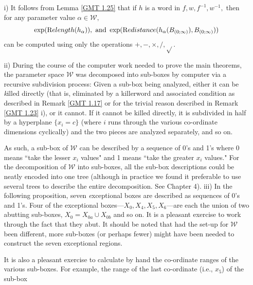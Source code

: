 \begin{remark}\label{GMT 1.26} i)  It follows from Lemma \ref{GMT 1.25} that if $h$ is a word in $f,w,f^{-1},w^{-1},$ then for any
parameter value $\alpha\in {\mathcal W},$
$$\exp({\textrm Relength}(h_\alpha)), \hbox{ and }
  \exp({\textrm Redistance}(h_\alpha(B_{(0;\infty)}), B_{(0;\infty)}))$$ can be computed using only the
operations $+, -, \times, /, \sqrt{}.$

 ii) During the course of the computer work needed to prove the main theorems, the parameter space
${\mathcal W}$ was decomposed into sub-boxes by computer via a recursive subdivision process:
Given a sub-box  being analyzed, either it can be {\textit killed directly} (that is, eliminated by a killerword and associated condition as described in
Remark \ref{GMT 1.17}
or for the trivial reason described in Remark \ref{GMT 1.23} i), or it cannot.  
If it cannot be killed directly, it is subdivided in half by a hyperplane
$\{x_i = c \}$ (where $i$ runs through the various co-ordinate dimensions
cyclically) and the two pieces are analyzed separately, and so on. 

As such, a sub-box of ${\mathcal W}$ can be described by a sequence of 0's and 1's where 0 means ``take the lesser $x_i$ values" and 1 means ``take the greater $x_i$ values."  
For the decomposition of ${\mathcal W}$ into sub-boxes, all the 
sub-box descriptions could be neatly encoded into one tree (although in practice we found it preferable to use several trees to describe the entire
decomposition.  See Chapter 4).
iii) In the following proposition, seven {\textit exceptional boxes} are described as sequences of 0's and 1's.  
Four of the exceptional boxes---$X_0, X_4, X_5, X_6$---are each the union of two abutting sub-boxes, $X_0 = X_{0a} \cup X_{0b}$ and so on.  It is a pleasant exercise to work through the fact that they abut.  
It should be noted that had the set-up for ${\mathcal W}$ been different, more sub-boxes (or perhaps fewer) might have been needed to construct the seven
exceptional regions. 

It is also a pleasant exercise to calculate by hand the co-ordinate ranges of the various sub-boxes.  For example, the range of the last co-ordinate (i.e., $x_5$) of the sub-box 
\eject


\end{remark}
